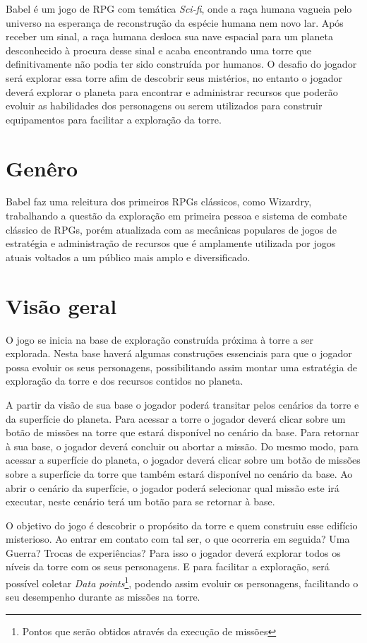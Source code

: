 \documentclass[11pt]{article} %
\begin{document}
Babel é um jogo de RPG com temática \textit{Sci-fi}, onde a raça humana vagueia pelo universo na esperança de reconstrução da espécie humana nem novo lar. Após receber um sinal, a raça humana desloca sua nave espacial para um planeta desconhecido à procura desse sinal e acaba encontrando uma torre que definitivamente não podia ter sido construída por humanos. O desafio do jogador será explorar essa torre afim de descobrir seus mistérios, no entanto o jogador deverá explorar o planeta para encontrar e administrar recursos que poderão evoluir as habilidades dos personagens ou serem utilizados para construir equipamentos para facilitar a exploração da torre.

\section{Genêro}

Babel faz uma releitura dos primeiros RPGs clássicos, como Wizardry, trabalhando a questão da exploração em primeira pessoa e sistema de combate clássico de RPGs, porém atualizada com as mecânicas populares de jogos de estratégia e administração de recursos que é amplamente utilizada por jogos atuais voltados a um público mais amplo e diversificado.
 
\section{Visão geral}

O jogo se inicia na base de exploração construída próxima à torre a ser explorada. Nesta base haverá algumas construções essenciais para que o jogador possa evoluir os seus personagens, possibilitando assim montar uma estratégia de exploração da torre e dos recursos contidos no planeta.

A partir da visão de sua base o jogador poderá transitar pelos cenários da torre e da superfície do planeta. Para acessar a torre o jogador deverá clicar sobre um botão de missões na torre que estará disponível no cenário da base. Para retornar à sua base, o jogador deverá concluir ou abortar a missão. Do mesmo modo, para acessar a superfície do planeta, o jogador deverá clicar sobre um botão de missões sobre a superfície da torre que também estará disponível no cenário da base. Ao abrir o cenário da superfície, o jogador poderá selecionar qual missão este irá executar, neste cenário terá um botão para se retornar à base.

O objetivo do jogo é descobrir o propósito da torre e quem construiu esse edifício misterioso. Ao entrar em contato com tal ser, o que ocorreria em seguida? Uma Guerra? Trocas de experiências? Para isso o jogador deverá explorar todos os níveis da torre com os seus personagens. E para facilitar a exploração, será possível coletar \textit{Data points}\footnote{Pontos que serão obtidos através da execução de missões}, podendo assim evoluir os personagens, facilitando o seu desempenho durante as missões na torre. 
\end{document}
